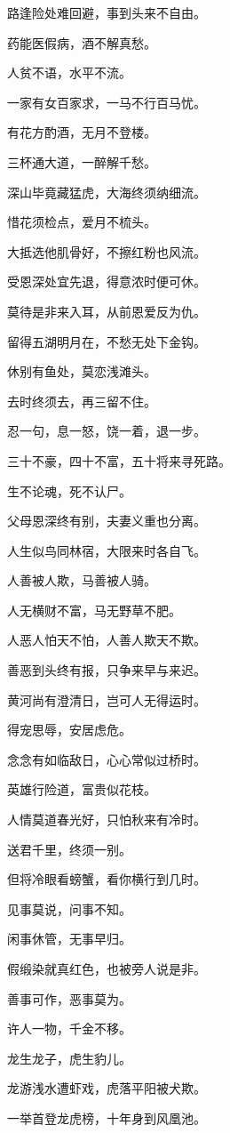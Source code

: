 \documentclass[12pt,oneside]{book}
\begin{document}
路逢险处难回避，事到头来不自由。

药能医假病，酒不解真愁。

人贫不语，水平不流。

一家有女百家求，一马不行百马忧。

有花方酌酒，无月不登楼。

三杯通大道，一醉解千愁。

深山毕竟藏猛虎，大海终须纳细流。

惜花须检点，爱月不梳头。

大抵选他肌骨好，不擦红粉也风流。

受恩深处宜先退，得意浓时便可休。

莫待是非来入耳，从前恩爱反为仇。

留得五湖明月在，不愁无处下金钩。

休别有鱼处，莫恋浅滩头。

去时终须去，再三留不住。

忍一句，息一怒，饶一着，退一步。

三十不豪，四十不富，五十将来寻死路。

生不论魂，死不认尸。

父母恩深终有别，夫妻义重也分离。

人生似鸟同林宿，大限来时各自飞。

人善被人欺，马善被人骑。

人无横财不富，马无野草不肥。

人恶人怕天不怕，人善人欺天不欺。

善恶到头终有报，只争来早与来迟。

黄河尚有澄清日，岂可人无得运时。

得宠思辱，安居虑危。

念念有如临敌日，心心常似过桥时。

英雄行险道，富贵似花枝。

人情莫道春光好，只怕秋来有冷时。

送君千里，终须一别。

但将冷眼看螃蟹，看你横行到几时。

见事莫说，问事不知。

闲事休管，无事早归。

假缎染就真红色，也被旁人说是非。

善事可作，恶事莫为。

许人一物，千金不移。

龙生龙子，虎生豹儿。

龙游浅水遭虾戏，虎落平阳被犬欺。

一举首登龙虎榜，十年身到风凰池。
\end{document}
